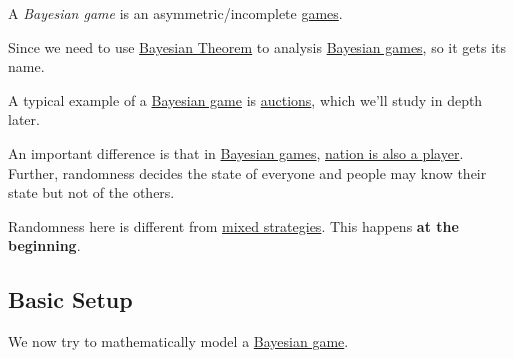 \begin{definition}\label{def:Bayesian-game}
	A \emph{Bayesian game} is an asymmetric/incomplete \hyperref[def:game]{games}.
\end{definition}
\begin{intuition}
	Since we need to use \href{https://en.wikipedia.org/wiki/Bayes%27_theorem}{Bayesian Theorem} to analysis \hyperref[def:Bayesian-game]{Bayesian games}, 
	so it gets its name.
\end{intuition}

\begin{eg}[Auction]
	A typical example of a \hyperref[def:Bayesian-game]{Bayesian game} is \hyperref[ch:auctions]{auctions}, which we'll study in depth later.
\end{eg}

An important difference is that in \hyperref[def:Bayesian-game]{Bayesian games}, \underline{nation is also a \hyperref[def:player]{player}}.
Further, randomness decides the state of everyone and people may know their state but not of the others.

\begin{note}
	Randomness here is different from \hyperref[def:mixed-strategy]{mixed strategies}. This happens \textbf{at the beginning}.
\end{note}

\subsection{Basic Setup}
We now try to mathematically model a \hyperref[def:Bayesian-game]{Bayesian game}.

